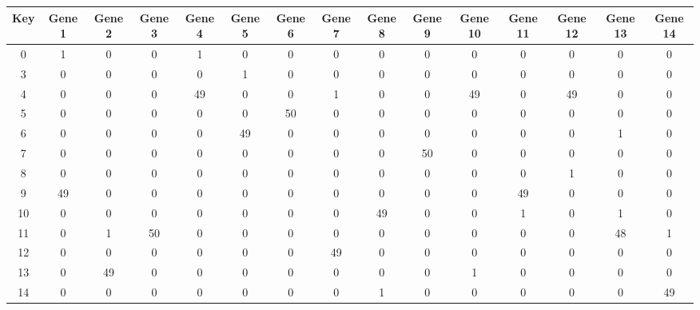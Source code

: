 \begin{tabular}{|c|c|c|c|c|c|c|c|c|c|c|c|c|c|c|}
\hline
Key & Gene 1 & Gene 2 & Gene 3 & Gene 4 & Gene 5 & Gene 6 & Gene 7 & Gene 8 & Gene 9 & Gene 10 & Gene 11 & Gene 12 & Gene 13 & Gene 14 \\
\hline
0 & 1 & 0 & 0 & 1 & 0 & 0 & 0 & 0 & 0 & 0 & 0 & 0 & 0 & 0 \\
3 & 0 & 0 & 0 & 0 & 1 & 0 & 0 & 0 & 0 & 0 & 0 & 0 & 0 & 0 \\
4 & 0 & 0 & 0 & 49 & 0 & 0 & 1 & 0 & 0 & 49 & 0 & 49 & 0 & 0 \\
5 & 0 & 0 & 0 & 0 & 0 & 50 & 0 & 0 & 0 & 0 & 0 & 0 & 0 & 0 \\
6 & 0 & 0 & 0 & 0 & 49 & 0 & 0 & 0 & 0 & 0 & 0 & 0 & 1 & 0 \\
7 & 0 & 0 & 0 & 0 & 0 & 0 & 0 & 0 & 50 & 0 & 0 & 0 & 0 & 0 \\
8 & 0 & 0 & 0 & 0 & 0 & 0 & 0 & 0 & 0 & 0 & 0 & 1 & 0 & 0 \\
9 & 49 & 0 & 0 & 0 & 0 & 0 & 0 & 0 & 0 & 0 & 49 & 0 & 0 & 0 \\
10 & 0 & 0 & 0 & 0 & 0 & 0 & 0 & 49 & 0 & 0 & 1 & 0 & 1 & 0 \\
11 & 0 & 1 & 50 & 0 & 0 & 0 & 0 & 0 & 0 & 0 & 0 & 0 & 48 & 1 \\
12 & 0 & 0 & 0 & 0 & 0 & 0 & 49 & 0 & 0 & 0 & 0 & 0 & 0 & 0 \\
13 & 0 & 49 & 0 & 0 & 0 & 0 & 0 & 0 & 0 & 1 & 0 & 0 & 0 & 0 \\
14 & 0 & 0 & 0 & 0 & 0 & 0 & 0 & 1 & 0 & 0 & 0 & 0 & 0 & 49 \\
\hline
\end{tabular}